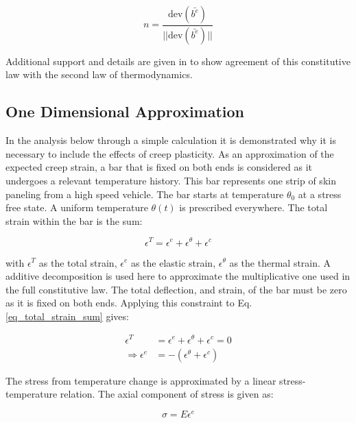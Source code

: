 \documentclass[conf]{new-aiaa}
\begin{document}
\begin{equation}
  n = \frac{\text{dev}( \bar{b^e}) }{ ||\text{dev}( \bar{b^e})||}
\end{equation}

\noindent
Additional support and details are given
in \cite{li_simulation_of_finite_strain_inelastic_phenomena_governed_by_creep_and_plasticity}
to show agreement of this constitutive law  with the second law of thermodynamics.

\subsection{One Dimensional Approximation}
In the analysis below through a simple calculation it is demonstrated
why it is necessary to include the effects of creep plasticity.
As an approximation of the expected creep strain,
a bar that is fixed on both ends is considered as it 
undergoes a relevant temperature history.
This bar represents one strip of skin paneling from 
a high speed vehicle.
The bar starts at temperature $\theta_0$ at a stress free state. 
A uniform temperature $\theta(t)$ is prescribed everywhere.
The total strain within the bar is the sum:

\begin{equation}
\epsilon^T = \epsilon^e  + \epsilon^\theta + \epsilon^c
\label{eq_total_strain_sum}
\end{equation}

\noindent
with $\epsilon^T$ as the total strain,
$\epsilon^e$ as the elastic strain,
$\epsilon^\theta$ as the thermal strain.
A additive decomposition is used here to approximate the multiplicative one 
used in the full constitutive law.
The total deflection, and strain, of the bar must be zero as it 
is fixed on both ends.
Applying this constraint to Eq. \ref{eq_total_strain_sum} gives:

\begin{align}
\epsilon^T &= \epsilon^e + \epsilon^\theta + \epsilon^c = 0 \\
\Rightarrow
  \epsilon^e &= -\left( \epsilon^\theta + \epsilon^c \right)  \label{eq_strain_balance}
\end{align}

\noindent
The stress from temperature change is approximated by
a linear stress-temperature relation. 
The axial component of stress is given as:

\begin{equation}
\sigma = E  \epsilon^e 
\end{equation}
\end{document}
